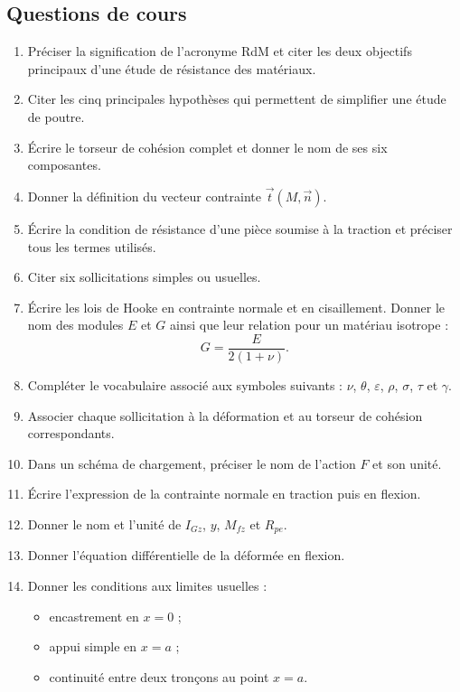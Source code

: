 
\subsection{Questions de cours}

\begin{enumerate}
  \item Préciser la signification de l'acronyme RdM et citer les deux objectifs principaux d'une étude de résistance des matériaux.
  \item Citer les cinq principales hypothèses qui permettent de simplifier une étude de poutre.
  \item Écrire le torseur de cohésion complet et donner le nom de ses six composantes.
  \item Donner la définition du vecteur contrainte $\vec t(M,\vec n)$.
  \item Écrire la condition de résistance d'une pièce soumise à la traction et préciser tous les termes utilisés.
  \item Citer six sollicitations simples ou usuelles.
  \item Écrire les lois de Hooke en contrainte normale et en cisaillement. Donner le nom des modules $E$ et $G$ ainsi que leur relation pour un matériau isotrope :
  \[
  G=\frac{E}{2(1+\nu)}.
  \]
  \item Compléter le vocabulaire associé aux symboles suivants : $\nu$, $\theta$, $\varepsilon$, $\rho$, $\sigma$, $\tau$ et $\gamma$.
  \item Associer chaque sollicitation à la déformation et au torseur de cohésion correspondants.
  \item Dans un schéma de chargement, préciser le nom de l'action $F$ et son unité.
  \item Écrire l'expression de la contrainte normale en traction puis en flexion.
  \item Donner le nom et l'unité de $I_{Gz}$, $y$, $M_{fz}$ et $R_{pe}$.
  \item Donner l'équation différentielle de la déformée en flexion.
  \item Donner les conditions aux limites usuelles :
  \begin{itemize}
    \item encastrement en $x=0$ ;
    \item appui simple en $x=a$ ;
    \item continuité entre deux tronçons au point $x=a$.
  \end{itemize}
\end{enumerate}

